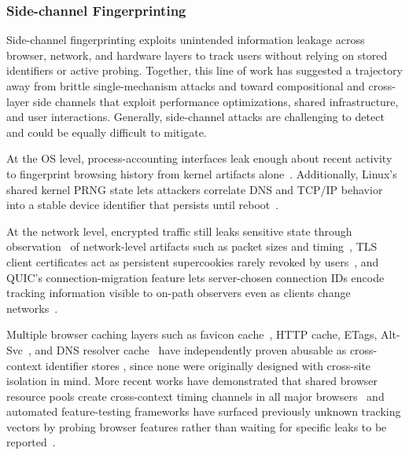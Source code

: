 \subsubsection{Side-channel Fingerprinting} 
\label{sec:stateless-techniques-side-channel-fingperinting}

Side-channel fingerprinting exploits unintended information leakage across browser, network, and hardware layers to track users without relying on stored identifiers or active probing.
%
Together, this line of work has suggested a trajectory away from brittle single-mechanism attacks and toward compositional and cross-layer side channels that exploit performance optimizations, shared infrastructure, and user interactions. 
%
Generally, side-channel attacks are challenging to detect and could be equally difficult to mitigate.


%
At the OS level, process-accounting interfaces leak enough about recent activity to fingerprint browsing history from kernel artifacts alone~\cite{janaMementoLearningSecrets2012}. 
%
Additionally, Linux's shared kernel PRNG state lets attackers correlate DNS and TCP/IP behavior into a stable device identifier that persists until reboot~\cite{kleinCrossLayerAttacks2021,kol2023device}.


%
At the network level, encrypted traffic still leaks sensitive state through observation \symObservation\ of network-level artifacts such as packet sizes and timing~\cite{chenSideChannelLeaksWeb2010,gonzalezUserProfilingTime2016}, TLS client certificates act as persistent supercookies rarely revoked by users~\cite{foppeExploitingTLSClient2018}, and QUIC's connection-migration feature lets server-chosen connection IDs encode tracking information visible to on-path observers even as clients change networks~\cite{syQUICLookWeb2019}. 


%
Multiple browser caching layers such as favicon cache~\cite{solomosTalesFaviconsCaches2021}, HTTP cache, ETags, Alt-Svc~\cite{mishraDejaVuAbusing2021}, and DNS resolver cache~\cite{klein2019dns} have independently proven abusable as cross-context identifier stores \symStorage, since none were originally designed with cross-site isolation in mind.
%
More recent works have demonstrated that shared browser resource pools create cross-context timing channels in all major browsers~\cite{snyderPoolPartyExploitingBrowser2023} and automated feature-testing frameworks have surfaced previously unknown tracking vectors by probing browser features rather than waiting for specific leaks to be reported~\cite{aliNavigatingMurkyWaters2023}.


